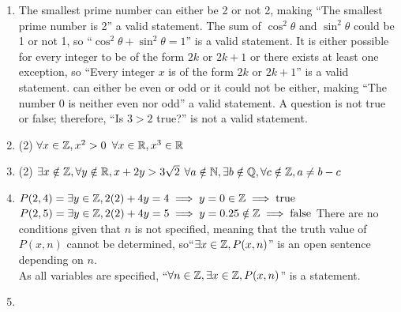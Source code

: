 \documentclass[../MATH135.tex]{subfiles}
\begin{document}
		\begin{enumerate}
			\item
				\begin{tasks}
					\task
						The smallest prime number can either be 2 or not 2, making \enquote{The smallest prime number is 2} a valid statement.
					\task
						The sum of \(\cos^2\theta\) and \(\sin^2\theta\) could be 1 or not 1, so \enquote{\(\cos^2\theta + \sin^2\theta = 1\)} is a valid statement.
					\task
						It is either possible for every integer to be of the form \(2k\) or \(2k + 1\) or there exists at least one exception, so \enquote{Every integer \(x\) is of the form \(2k\) or \(2k + 1\)} is a valid statement.
					 can either be even or odd or it could not be either, making \enquote{The number 0 is neither even nor odd} a valid statement.
					\task
						A question is not true or false; therefore, \enquote{Is \(3 > 2\) true?} is not a valid statement.
				\end{tasks}
			\item
				\begin{tasks}(2)
					\task
						\(\forall x \in \mathbb{Z}, x^2 > 0\)
					\task
						\(\forall x \in \mathbb{R}, x^3 \in \mathbb{R}\)				
				\end{tasks}
			\item
				\begin{tasks}(2)
					\task
						\(\exists x \notin \mathbb{Z}, \forall y \notin \mathbb{R}, x + 2y > 3\sqrt{2}\)
					\task
						\(\forall a \notin \mathbb{N}, \exists b \notin \mathbb{Q}, \forall c \notin \mathbb{Z}, a \ne b - c\)
				\end{tasks}
			\item
				\begin{tasks}
					\task	
						\(P(2, 4) = \exists y \in \mathbb{Z}, 2(2) + 4y = 4 \implies y = 0 \in \mathbb{Z} \implies \text{true}\) \\
						\(P(2, 5) = \exists y \in \mathbb{Z}, 2(2) + 4y = 5 \implies y = 0.25 \notin \mathbb{Z} \implies \text{false}\)
					\task
						There are no conditions given that \(n\) is not specified, meaning that the truth value of \(P(x, n)\) cannot be determined, so\enquote{\(\exists x \in \mathbb{Z}, P(x, n)\)} is an open sentence depending on \(n\). \\
					\task
						As all variables are specified, \enquote{\(\forall n \in \mathbb{Z}, \exists x \in \mathbb{Z}, P(x, n)\)} is a statement.
				\end{tasks}
			\item
				\begin{tasks}
					\task
						\begin{align*}

\end{align*}
\end{tasks}
\end{enumerate}
\end{document}
